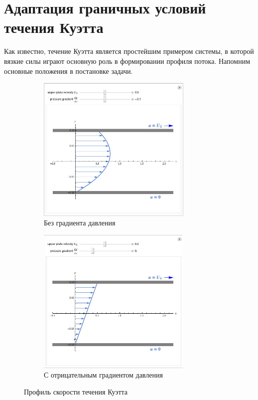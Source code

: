 \section{Адаптация граничных условий течения Куэтта} %
\label{sec:KuetteAdaptation}
	Как известно, течение Куэтта является простейшим примером системы, в которой вязкие силы играют основную роль в формировании профиля потока. Напомним основные положения в постановке задачи.

	\begin{figure}[h]
	\centering
        \begin{subfigure}{0.45\textwidth}
            \includegraphics[height=200pt]{Images/KouetteFlowWithPressure}
            \caption{Без градиента давления}
            \label{fig:KuetteFlow:WithoutPressure}
        \end{subfigure}
        \begin{subfigure}{0.45\textwidth}
            \includegraphics[height=200pt]{Images/KouetteFlowWithoutPressure}
            \caption{С отрицательным градиентом давления}
            \label{fig:KuetteFlow:WithPressure}
        \end{subfigure}
        \caption{Профиль скорости течения Куэтта}
        \label{fig:KuetteFlow}
	\end{figure}

